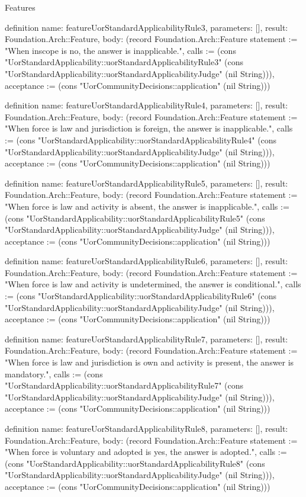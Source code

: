 \begin{lexlean}{Features}
\begin{semanticmodule}
definition{
  name: featureUorStandardApplicabilityRule3,
  parameters: [],
  result: Foundation.Arch::Feature,
  body: (record Foundation.Arch::Feature {statement := "When inscope is no, the answer is inapplicable.", calls := (cons "UorStandardApplicability::uorStandardApplicabilityRule3" (cons "UorStandardApplicability::uorStandardApplicabilityJudge" (nil String))), acceptance := (cons "UorCommunityDecisions::application" (nil String))})
}

definition{
  name: featureUorStandardApplicabilityRule4,
  parameters: [],
  result: Foundation.Arch::Feature,
  body: (record Foundation.Arch::Feature {statement := "When force is law and jurisdiction is foreign, the answer is inapplicable.", calls := (cons "UorStandardApplicability::uorStandardApplicabilityRule4" (cons "UorStandardApplicability::uorStandardApplicabilityJudge" (nil String))), acceptance := (cons "UorCommunityDecisions::application" (nil String))})
}

definition{
  name: featureUorStandardApplicabilityRule5,
  parameters: [],
  result: Foundation.Arch::Feature,
  body: (record Foundation.Arch::Feature {statement := "When force is law and activity is absent, the answer is inapplicable.", calls := (cons "UorStandardApplicability::uorStandardApplicabilityRule5" (cons "UorStandardApplicability::uorStandardApplicabilityJudge" (nil String))), acceptance := (cons "UorCommunityDecisions::application" (nil String))})
}

definition{
  name: featureUorStandardApplicabilityRule6,
  parameters: [],
  result: Foundation.Arch::Feature,
  body: (record Foundation.Arch::Feature {statement := "When force is law and activity is undetermined, the answer is conditional.", calls := (cons "UorStandardApplicability::uorStandardApplicabilityRule6" (cons "UorStandardApplicability::uorStandardApplicabilityJudge" (nil String))), acceptance := (cons "UorCommunityDecisions::application" (nil String))})
}

definition{
  name: featureUorStandardApplicabilityRule7,
  parameters: [],
  result: Foundation.Arch::Feature,
  body: (record Foundation.Arch::Feature {statement := "When force is law and jurisdiction is own and activity is present, the answer is mandatory.", calls := (cons "UorStandardApplicability::uorStandardApplicabilityRule7" (cons "UorStandardApplicability::uorStandardApplicabilityJudge" (nil String))), acceptance := (cons "UorCommunityDecisions::application" (nil String))})
}

definition{
  name: featureUorStandardApplicabilityRule8,
  parameters: [],
  result: Foundation.Arch::Feature,
  body: (record Foundation.Arch::Feature {statement := "When force is voluntary and adopted is yes, the answer is adopted.", calls := (cons "UorStandardApplicability::uorStandardApplicabilityRule8" (cons "UorStandardApplicability::uorStandardApplicabilityJudge" (nil String))), acceptance := (cons "UorCommunityDecisions::application" (nil String))})
}


\end{semanticmodule}
\end{lexlean}
